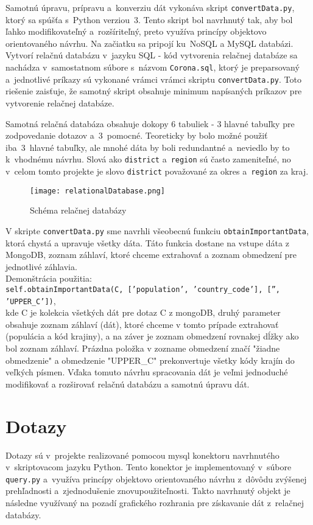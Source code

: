 \documentclass [11pt, a4paper]{article}
\begin{document}
Samotnú úpravu, prípravu a~konverziu dát vykonáva skript \texttt{convertData.py}, ktorý sa spúšťa s~Python verziou~3. Tento skript bol navrhnutý tak, aby bol ľahko modifikovateľný a~rozšíriteľný, preto využíva princípy objektovo orientovaného návrhu. Na začiatku sa pripojí ku~NoSQL a MySQL databázi. Vytvorí relačnú databázu v~jazyku SQL - kód vytvorenia relačnej databáze sa nachádza v~samostatnom súbore s~názvom \texttt{Corona.sql}, ktorý je preparsovaný a~jednotlivé príkazy sú vykonané vrámci vrámci skriptu \texttt{convertData.py}. Toto riešenie zaisťuje, že samotný skript obsahuje minimum  napísaných príkazov pre vytvorenie relačnej databáze.

Samotná relačná databáza obsahuje dokopy 6 tabuliek - 3 hlavné tabuľky pre zodpovedanie dotazov a~3~pomocné. Teoreticky by bolo možné použiť iba~3~hlavné tabuľky, ale mnohé dáta by boli redundantné a~neviedlo by to k~vhodnému návrhu. Slová ako \texttt{district} a~\texttt{region} sú často zameniteľné, no v~celom tomto projekte je slovo \texttt{district} považované za okres a~\texttt{region} za kraj.

\begin{figure}[H]
\begin{center}
\texttt{[image: relationalDatabase.png]}
\caption{Schéma relačnej databázy}
\end{center}
\end{figure}

V skripte \texttt{convertData.py} sme navrhli všeobecnú funkciu \texttt{obtainImportantData}, ktorá chystá a upravuje všetky dáta. Táto funkcia dostane na vstupe dáta z MongoDB, zoznam záhlaví, ktoré chceme extrahovať a zoznam obmedzení pre jednotlivé záhlavia.\\

Demonštrácia použitia:\\
\texttt{self.obtainImportantData(C, ['population', 'country\_code'], ['', 'UPPER\_C'])}, \\kde C je kolekcia všetkých dát pre dotaz C z mongoDB, druhý parameter obsahuje zoznam záhlaví (dát), ktoré chceme v tomto prípade extrahovať (populácia a kód krajiny), a na záver je zoznam obmedzení rovnakej dĺžky ako bol zoznam záhlaví. Prázdna položka v zozname obmedzení značí "žiadne obmedzenie" a obmedzenie "UPPER\_C" prekonvertuje všetky kódy krajín do veľkých písmen. Vďaka tomuto návrhu spracovania dát je veľmi jednoduché modifikovať a rozširovať relačnú databázu a samotnú úpravu dát.

\section*{Dotazy}
Dotazy sú v~projekte realizované pomocou mysql konektoru navrhnutého v~skriptovacom jazyku Python. Tento konektor je implementovaný v~súbore \texttt{query.py} a~využíva princípy objektovo orientovaného návrhu z~dôvôdu zvýšenej prehľadnosti a~zjednodušenie znovupoužiteľnosti. Takto navrhnutý objekt je následne využívaný na pozadí grafického rozhrania pre získavanie dát z~relačnej databázy.
\end{document}
